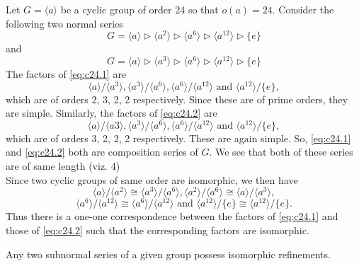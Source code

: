 \documentclass[../main-sheet.tex]{subfiles}
\begin{document}
\begin{ex}
Let \(G =\langle a \rangle\) be a cyclic group of order 24 so that \(o(a) = 24\).
Consider the following two normal series
\begin{equation}
    G = \langle a \rangle \vartriangleright \langle a^2 \rangle \vartriangleright \langle a^6 \rangle \vartriangleright \langle a^{12} \rangle \vartriangleright \{e\} \label{eq:c24.1}
\end{equation}
and
\begin{equation}
    G = \langle a \rangle \vartriangleright \langle a^3 \rangle \vartriangleright \langle a^6 \rangle \vartriangleright \langle a^{12} \rangle \vartriangleright \{e\} \label{eq:c24.2}
\end{equation}
The factors of \eqref{eq:c24.1} are
\[
\langle a \rangle/\langle a^3 \rangle, \langle a^3 \rangle/\langle a^6 \rangle, \langle a^6 \rangle/\langle a^{12} \rangle \text{ and } \langle a^{12} \rangle/\{e\},
\]
which are of orders 2, 3, 2, 2 respectively. Since these are of prime orders, they are
simple.
Similarly, the factors of \eqref{eq:c24.2} are
\[\langle a \rangle/\langle a3 \rangle, \langle a^3 \rangle/\langle a^6 \rangle, \langle a^6 \rangle/\langle a^{12} \rangle \text{ and } \langle a^{12} \rangle/\{e\},\]
which are of orders 3, 2, 2, 2 respectively. These are again simple.
So, \eqref{eq:c24.1} and \eqref{eq:c24.2} both are composition series of \(G\).
We see that both of these series are of same length (viz. 4)\\
Since two cyclic groups of same order are isomorphic, we then have
\[\langle a \rangle/\langle a^2 \rangle\cong \langle a^3 \rangle/\langle a^6 \rangle, \langle a^2 \rangle/\langle a^6 \rangle \cong \langle a \rangle/\langle a^3 \rangle,\]
\[\langle a^6 \rangle/\langle a^{12} \rangle \cong \langle a^6 \rangle/\langle a^{12} \rangle \text{ and } \langle a^{12} \rangle/\{e\} \cong \langle a^{12} \rangle/ \{e\}.\]
Thus there is a one-one correspondence between the factors of \eqref{eq:c24.1} and those of \eqref{eq:c24.2}
such that the corresponding factors are isomorphic.
\end{ex}
\begin{thm}
     Any two subnormal series of a given group possess isomorphic
    refinements.
\end{thm}
\end{document}
